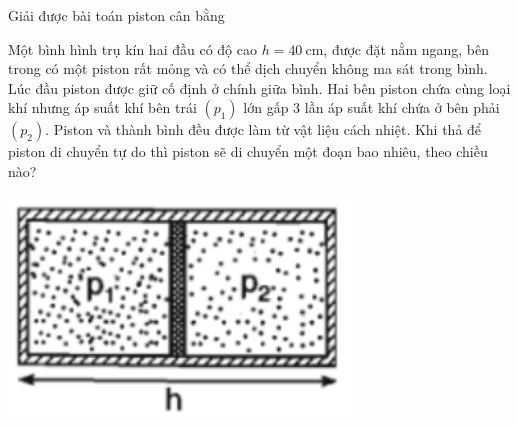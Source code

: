 \begin{dang}{Giải được bài toán piston cân bằng}
{Một bình hình trụ kín hai đầu có độ cao $h=\SI{40}{\centi\meter}$, được đặt nằm ngang, bên trong có một piston rất mỏng và có thể dịch chuyển không ma sát trong bình. Lúc đầu piston được giữ cố định ở chính giữa bình. Hai bên piston chứa cùng loại khí nhưng áp suất khí bên trái $\left(p_1\right)$ lớn gấp 3 lần áp suất khí chứa ở bên phải $\left(p_2\right)$. Piston và thành bình đều được làm từ vật liệu cách nhiệt. Khi thả để piston di chuyển tự do thì piston sẽ di chuyển một đoạn bao nhiêu, theo chiều nào?
\begin{center}
	\includegraphics[width=0.25\linewidth]{../figs/VN12-Y24-PH-SYL-010-10}
\end{center}

}
{}
\end{dang}
